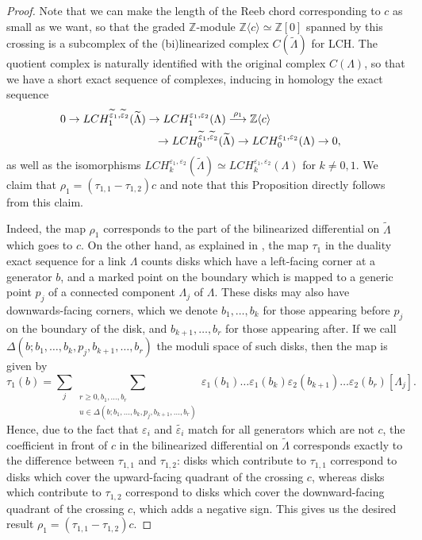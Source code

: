\documentclass[11pt]{amsart}
\theoremstyle{plain}
\theoremstyle{remark}
\numberwithin{equation}{section}
\newcommand{\Z}{\ensuremath{\mathbb{Z}}}
\begin{document}
\begin{proof}
Note that we can make the length of the Reeb chord corresponding to $c$ as small as we want, so that the graded 
$\Z$-module $\Z\langle c \rangle \simeq \Z[0]$ spanned by this crossing is a subcomplex of the (bi)linearized complex 
$C(\widetilde{\Lambda})$ for LCH. The quotient complex is naturally identified with the original complex
$C(\Lambda)$, so that we have a short exact sequence of complexes, inducing in homology the exact sequence
\begin{align*}
\lefteqn{0 \to LCH^{\widetilde{\varepsilon}_1, \widetilde{\varepsilon}_2}_1(\widetilde{\Lambda}) \to 
LCH^{\varepsilon_1, \varepsilon_2}_1(\Lambda) \stackrel{\rho_1}{\longrightarrow} \Z\langle c \rangle}  \\
& \hspace{3cm} \to LCH^{\widetilde{\varepsilon}_1, \widetilde{\varepsilon}_2}_0(\widetilde{\Lambda}) \to 
LCH^{\varepsilon_1, \varepsilon_2}_0(\Lambda) \to 0,
\end{align*}
as well as the isomorphisms $LCH^{\varepsilon_1, \varepsilon_2}_k(\widetilde{\Lambda}) \simeq LCH^{\varepsilon_1, \varepsilon_2}_k(\Lambda)$ for
$k \neq 0, 1$.
We claim that $\rho_1 = (\tau_{1,1} - \tau_{1,2})c$ and note that this Proposition directly follows from this claim.

Indeed, the map $\rho_1$ corresponds to the part of the bilinearized differential on $\widetilde{\Lambda}$ which goes to $c$. On the other hand, as explained in \cite[Section 3.2.5]{BC}, the map $\tau_1$ in the duality exact sequence for a link $\Lambda$ counts disks which have a left-facing corner at a generator $b$, and a marked point on the boundary which is mapped to a generic point $p_j$ of a connected component $\Lambda_j$ of $\Lambda$. These disks may also have downwards-facing corners, which we denote $b_1,…,b_k$ for those appearing before $p_j$ on the boundary of the disk, and $b_{k+1},…,b_r$ for those appearing after. If we call $\Delta(b;b_1,…,b_k,p_j,b_{k+1},…,b_r)$ the moduli space of such disks, then the map is given by
$$\tau_1(b)=\sum_j\sum_{\substack{r \ge 0, b_1, \ldots, b_r \\ u \in \Delta(b;b_1, …,b_k,p_j,b_{k+1},…,b_r)}} \varepsilon_1(b_1)…\varepsilon_1(b_k)\varepsilon_2(b_{k+1})…\varepsilon_2(b_r)[\Lambda_j].$$
Hence, due to the fact that $\varepsilon_i$ and $\widetilde{\varepsilon_i}$ match for all generators which are not $c$, the coefficient in front of $c$ in the bilinearized differential on $\widetilde{\Lambda}$ corresponds exactly to the difference between $\tau_{1,1}$ and $\tau_{1,2}$: disks which contribute to $\tau_{1,1}$ correspond to disks which cover the upward-facing quadrant of the crossing $c$, whereas disks which contribute to $\tau_{1,2}$ correspond to disks which cover the downward-facing quadrant of the crossing $c$, which adds a negative sign. This gives us the desired result $\rho_1 = (\tau_{1,1} - \tau_{1,2})c$. 
\end{proof}
\end{document}

